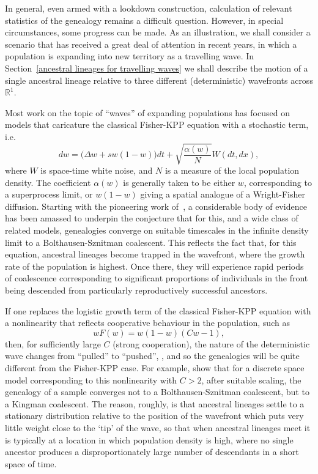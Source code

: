 \documentclass[12pt]{article}
\newcommand{\IR}{\mathbb R}
\numberwithin{equation}{section}
\begin{document}
In general, even armed with a lookdown construction, calculation of relevant statistics 
of the genealogy remains a difficult question. 
However, in special
circumstances, some progress can be made. As an illustration, 
we shall consider a scenario that
has received a great deal of attention in recent years, in which 
a population is expanding into new territory as a travelling wave. 
In Section~\ref{ancestral lineages for travelling waves}
we shall describe the motion of a single ancestral lineage relative to
three different (deterministic) wavefronts across $\IR^1$.

Most work on the topic of ``waves'' of expanding populations
has focused on models that caricature the classical Fisher-KPP equation with a 
stochastic term, i.e.
$$dw=\big(\Delta w +sw(1-w)\big)dt +\sqrt{\frac{\alpha(w)}{N}}W(dt,dx),$$
where $W$ is space-time white noise, and $N$ is a measure of the 
local population density. The coefficient
$\alpha(w)$ is generally taken to be either
$w$, corresponding to a superprocess limit, or $w(1-w)$ giving a 
spatial analogue of a Wright-Fisher diffusion. 
Starting with the pioneering work of~\cite{brunet/derrida/mueller/munier:2006},
a considerable body of evidence has been amassed to underpin the
conjecture that for this, and a wide class of related models, 
genealogies converge on suitable timescales in the infinite density limit
to a Bolthausen-Sznitman coalescent. %
This reflects the fact that, for this equation, 
ancestral lineages become trapped in 
the wavefront, where the growth rate of the population is highest. 
Once there, they will experience 
rapid periods of coalescence 
corresponding to significant proportions of individuals in the front being 
descended from particularly reproductively successful ancestors. 

If one replaces the logistic growth term of the classical
Fisher-KPP equation with a nonlinearity that reflects cooperative
behaviour in the population, such as
\begin{equation}
	\label{Birzu nonlinearity}
	wF(w)=w(1-w)(Cw-1),
\end{equation}
then, for sufficiently large $C$ (strong cooperation),
the nature of the deterministic
wave changes from ``pulled'' to ``pushed'', 
\citep{birzu/hallatschek/korolev:2017, birzu/hallatschek/korolev:2021},
and so the genealogies will be quite different from the Fisher-KPP case. 
For example, \citet{etheridge/penington:2022}
show that for a discrete space model corresponding to this 
nonlinearity with $C>2$, after suitable scaling, the genealogy of a
sample converges not to a Bolthausen-Sznitman coalescent, but to
a Kingman coalescent. 
The reason, roughly, is that ancestral lineages
settle to a stationary distribution relative to the position of the 
wavefront which puts very little weight close to the `tip' of the wave, so
that when ancestral lineages meet
it is typically at a location in which population density is
high, where no single ancestor produces a disproportionately large number of 
descendants in a short space of time. 
\end{document}
